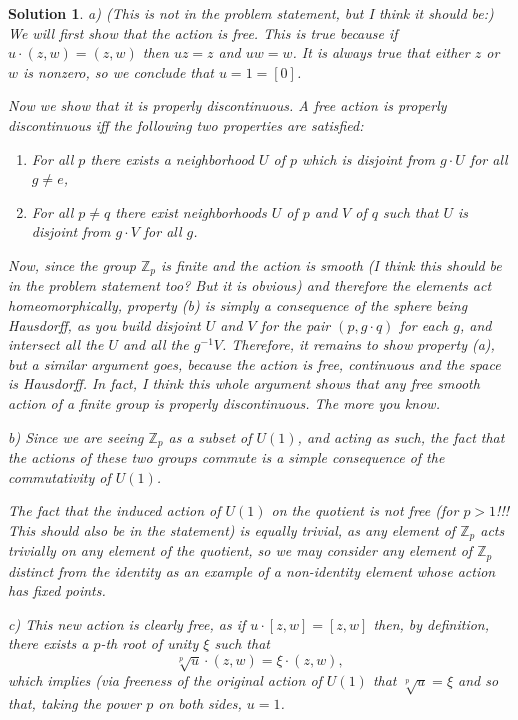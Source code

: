 \documentclass{article}
\theoremstyle{nonumberplain}
\newtheorem{sol}{Solution}
\newcommand{\Z}{\mathbb{Z}}
\begin{document}
\begin{sol}
a) (This is not in the problem statement, but I think it should be:) We will first show that the action is free. This is true because if $u \cdot (z,w) = (z,w)$ then $u z = z$ and $u w = w$. It is always true that either $z$ or $w$ is nonzero, so we conclude that $u = 1 = [0]$.

Now we show that it is properly discontinuous. A free action is properly discontinuous iff the following two properties are satisfied:
\begin{enumerate}
\item For all $p$ there exists a neighborhood $U$ of $p$ which is disjoint from $g \cdot U$ for all $g \neq e$,
\item For all $p \neq q$ there exist neighborhoods $U$ of $p$ and $V$ of $q$ such that $U$ is disjoint from $g \cdot V$ for all $g$.
\end{enumerate}

Now, since the group $\Z_p$ is finite and the action is smooth (I think this should be in the problem statement too? But it is obvious) and therefore the elements act homeomorphically, property (b) is simply a consequence of the sphere being Hausdorff, as you build disjoint $U$ and $V$ for the pair $(p,g \cdot q)$ for each $g$, and intersect all the $U$ and all the $g^{-1} V$. Therefore, it remains to show property (a), but a similar argument goes, because the action is free, continuous and the space is Hausdorff. In fact, I think this whole argument shows that any free smooth action of a finite group is properly discontinuous. The more you know.

\medskip

b) Since we are seeing $\Z_p$ as a subset of $U(1)$, and acting as such, the fact that the actions of these two groups commute is a simple consequence of the commutativity of $U(1)$.

The fact that the induced action of $U(1)$ on the quotient is not free (for $p>1$!!! This should also be in the statement) is equally trivial, as any element of $\Z_p$ acts trivially on any element of the quotient, so we may consider any element of $\Z_p$ distinct from the identity as an example of a non-identity element whose action has fixed points.

\medskip

c) This new action is clearly free, as if $u \cdot [z,w] = [z,w]$ then, by definition, there exists a $p$-th root of unity $\xi$ such that
\[\sqrt[p]{u} \cdot (z,w) = \xi \cdot (z,w),\]
which implies (via freeness of the original action of $U(1)$ that $\sqrt[p]{u} = \xi$ and so that, taking the power $p$ on both sides, $u = 1$.


\end{sol}
\end{document}

